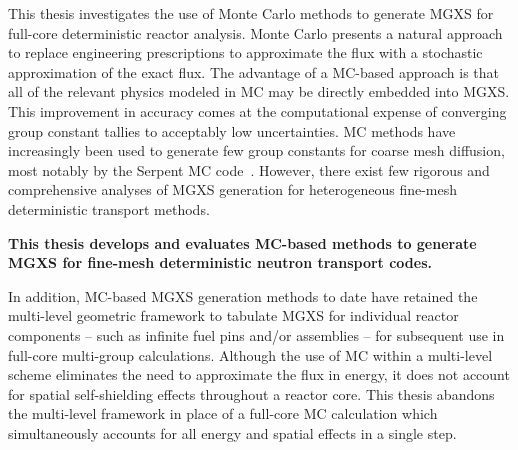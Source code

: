 
This thesis investigates the use of Monte Carlo methods to generate \ac{MGXS} for full-core deterministic reactor analysis. Monte Carlo presents a natural approach to replace engineering prescriptions to approximate the flux with a stochastic approximation of the exact flux. The advantage of a \ac{MC}-based approach is that all of the relevant physics modeled in \ac{MC} may be directly embedded into \ac{MGXS}. This improvement in accuracy comes at the computational expense of converging group constant tallies to acceptably low uncertainties. \ac{MC} methods have increasingly been used to generate few group constants for coarse mesh diffusion, most notably by the Serpent \ac{MC} code~\cite{serpent2013manual}. However, there exist few rigorous and comprehensive analyses of \ac{MGXS} generation for heterogeneous fine-mesh deterministic transport methods.

\begin{emphbox}
\textbf{This thesis develops and evaluates \ac{MC}-based methods to generate \ac{MGXS} for fine-mesh deterministic neutron transport codes.}
\end{emphbox}

\vspace{-0.1in}

In addition, \ac{MC}-based \ac{MGXS} generation methods to date have retained the multi-level geometric framework to tabulate \ac{MGXS} for individual reactor components -- such as infinite fuel pins and/or assemblies -- for subsequent use in full-core multi-group calculations. Although the use of \ac{MC} within a multi-level scheme eliminates the need to approximate the flux in energy, it does not account for spatial self-shielding effects throughout a reactor core. This thesis abandons the multi-level framework in place of a full-core \ac{MC} calculation which simultaneously accounts for all energy and spatial effects in a single step.

